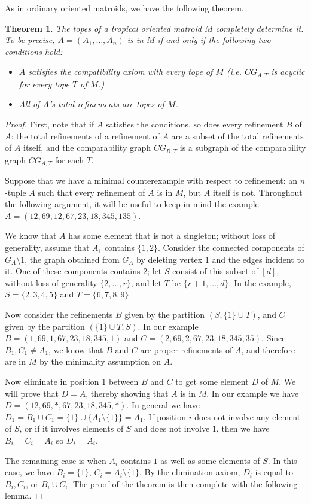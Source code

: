 \documentclass[11pt]{amsart}
\newtheorem{thm}{Theorem}[section]
\begin{document}
As in ordinary oriented matroids, we have the following theorem.

\begin{thm}\label{topes-determine}
The topes of a tropical oriented matroid $M$ completely determine it. To be precise, $A = (A_1, \ldots, A_n)$ is in 
$M$ if and only if the following two conditions hold:
\begin{itemize}
\item $A$ satisfies the compatibility axiom with every tope of $M$ (\emph{i.e.} $CG_{A, T}$ is acyclic for every tope $T$ 
of $M$.)
\item All of $A$'s total refinements are topes of $M$.
\end{itemize}
\end{thm}

\begin{proof}
First, note that if $A$ satisfies the conditions, so does every refinement $B$ of $A$: the total refinements of a 
refinement of $A$ are a subset of the total refinements of $A$ itself, and the comparability graph $CG_{B, T}$ is a 
subgraph of the comparability graph $CG_{A, T}$ for each $T$.

Suppose that we have a minimal counterexample with respect to refinement: an $n$-tuple $A$ such that every refinement of $A$ is in 
$M$, but $A$ itself is not. 
Throughout the following argument, it will be useful to keep in mind the example $A=(12,69,12,67,23,18,345,135)$.

We know that $A$ has some element that is not a singleton; without loss of generality, assume that $A_1$ contains $\{1, 2\}$. 
Consider the connected components of $G_A\setminus 1$, the graph obtained from $G_A$ by deleting vertex $1$ and the edges incident to it. One of these components contains 2; let $S$ consist of 
this subset of $[d]$, without loss of generality $\{2, \ldots, r\}$, and let $T$ be $\{r+1, \ldots, d\}$. In the example, $S=\{2,3,4,5\}$ and $T=\{6,7,8,9\}$. 

Now consider the refinements 
$B$ given by the partition $(S, \{1\}\cup T)$, and $C$ given by the partition $(\{1\}\cup T, S)$. In our example $B=(1,69,1,67,23,18,345,1)$ and $C=(2,69,2,67,23,18,345,35)$. Since $B_1,C_1 \neq A_1$, we know that $B$ and $C$ are 
proper refinements of $A$, and therefore are in $M$ by the minimality assumption on $A$.

Now eliminate in position 1 between $B$ and $C$ to get 
some element $D$ of $M$. We will prove that $D=A$, thereby showing that $A$ is in $M$.
In our example we have $D=(12,69,*,67,23,18,345,*)$. In general we have $D_1 = B_1\cup C_1 = \{1\}\cup \{A_1\setminus \{1\}\} = A_1$. If position $i$ does not involve any element of $S$, or if it involves elements of $S$ and does not involve $1$, then we have $B_i = C_i = A_i$ so $D_i = A_i$.

The remaining case is when $A_i$
contains $1$ as well as some elements of $S$. In this case, we have $B_i = \{1\}$, $C_i = A_i \setminus \{1\}$. By the elimination 
axiom, $D_i$ is equal to $B_i, C_i$, or $B_i\cup C_i$. 
The proof of the theorem is then complete with the following lemma.
\end{proof}
\end{document}
